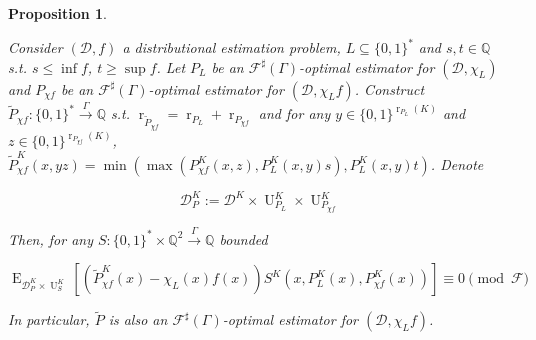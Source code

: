 \documentclass{article}
\numberwithin{equation}{section}
\theoremstyle{definition}
\theoremstyle{plain}
\newtheorem{proposition}{Proposition}[section]
\newcommand{\Bool}{\{0,1\}}
\newcommand{\Words}{{\Bool^*}}
\DeclareMathOperator{\E}{E}
\DeclareMathOperator{\R}{r}
\DeclareMathOperator{\Un}{U}
\newcommand{\Rats}{\mathbb{Q}}
\newcommand{\Dist}{\mathcal{D}}
\newcommand{\Fall}{\mathcal{F}}
\newcommand{\ESG}{\Fall^\sharp(\Gamma)}
\newcommand{\BoolR}[1]{\Bool^{\R_{#1}(K)}}
\newcommand{\Scheme}{\xrightarrow{\Gamma}}
\begin{document}
\begin{samepage}
\begin{proposition}
\label{prp:thm__cond__lemma}

Consider $(\Dist, f)$ a distributional estimation problem, ${L \subseteq \Words}$ and $s, t \in \Rats$ s.t. ${s \leq \inf f}$, $t \geq \sup f$. Let $P_L$ be an $\ESG$-optimal estimator for $(\Dist, \chi_L)$ and $P_{\chi f}$ be an $\ESG$-optimal estimator for $(\Dist, \chi_L f)$. Construct $\tilde{P}_{\chi f}: \Words \Scheme \Rats$ s.t. $\R_{\tilde{P}_{\chi f}} = \R_{P_L} + \R_{P_{\chi f}}$ and for any ${y \in \BoolR{P_L}}$ and $z \in \BoolR{P_{\chi f}}$, ${\tilde{P}_{\chi f}^K(x,yz)=\min(\max(P_{\chi f}^K(x,z),P_L^K(x,y) s),P_L^K(x,y) t)}$. Denote 

\[\Dist_P^K:=\Dist^{K} \times \Un_{P_L}^K \times \Un_{P_{\chi f}}^K\] 

Then, for any $S: \Words \times \Rats^2 \Scheme \Rats$ bounded

\begin{equation}
\E_{\Dist_P^K \times \Un_S^K}[(\tilde{P}_{\chi f}^K(x)-\chi_L(x)f(x))S^K(x,P_L^K(x),P_{\chi f}^K(x))]  \equiv 0 \pmod \Fall
\end{equation}

In particular, $\tilde{P}$ is also an $\ESG$-optimal estimator for $(\Dist, \chi_L f)$.

\end{proposition}
\end{samepage}
\end{document}
